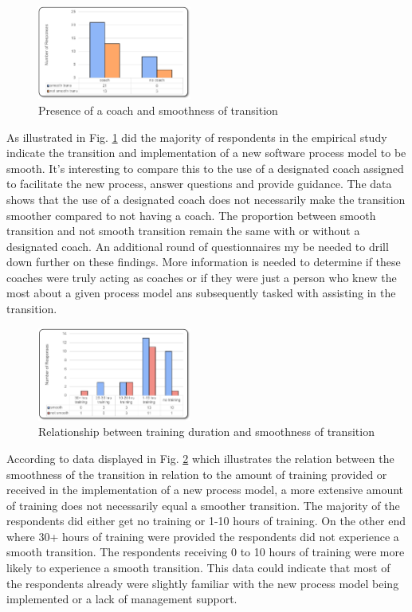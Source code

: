 \documentclass[conference]{IEEEtran}
\begin{document}
\begin{figure}[H]
    \centering
    \includegraphics[width=0.45\textwidth]{images/Emp-CoachVsSmoothTrans}
    \caption{Presence of a coach and smoothness of transition}
    \label{fig:CoachVsSmooth}
\end{figure}

As illustrated in Fig. \ref{fig:CoachVsSmooth} did the majority of respondents in the empirical study indicate the transition and implementation of a new software process model to be smooth. It's interesting to compare this to the use of a designated coach assigned to facilitate the new process, answer questions and provide guidance. The data shows that the use of a designated coach does not necessarily make the transition smoother compared to not having a coach. The proportion between smooth transition and not smooth transition remain the same with or without a designated coach. An additional round of questionnaires my be needed to drill down further on these findings. More information is needed to determine if these coaches were truly acting as coaches or if they were just a person who knew the most about a given process model ans subsequently tasked with assisting in the transition.

\begin{figure}[H]
    \centering
    \includegraphics[width=0.45\textwidth]{images/Emp-TrainingVsSmoothTrans}
    \caption{Relationship between training duration and smoothness of transition}
    \label{fig:TrainingVsSmooth}
\end{figure}

According to data displayed in Fig. \ref{fig:TrainingVsSmooth} which illustrates the relation between the smoothness of the transition in relation to the amount of training provided or received in the implementation of a new process model, a more extensive amount of training does not necessarily equal a smoother transition. The majority of the respondents did either get no training or 1-10 hours of training. On the other end where 30+ hours of training were provided the respondents did not experience a smooth transition. The respondents receiving 0 to 10 hours of training were more likely to experience a smooth transition. This data could indicate that most of the respondents already were slightly familiar with the new process model being implemented or a lack of management support. 
\end{document}
